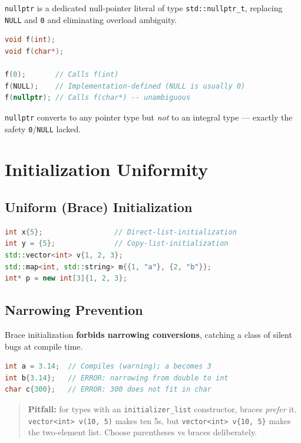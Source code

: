 \texttt{nullptr} is a dedicated null-pointer literal of type \texttt{std::nullptr\_t}, replacing \texttt{NULL} and \texttt{0} and eliminating overload ambiguity.

\begin{lstlisting}[language=C++, caption={nullptr resolves overload ambiguity}]
void f(int);
void f(char*);

f(0);       // Calls f(int)
f(NULL);    // Implementation-defined (NULL is usually 0)
f(nullptr); // Calls f(char*) -- unambiguous
\end{lstlisting}

\texttt{nullptr} converts to any pointer type but \emph{not} to an integral type --- exactly the safety \texttt{0}/\texttt{NULL} lacked.

\section{Initialization Uniformity}

\subsection{Uniform (Brace) Initialization}

\begin{lstlisting}[language=C++, caption={brace initialization everywhere}]
int x{5};                 // Direct-list-initialization
int y = {5};              // Copy-list-initialization
std::vector<int> v{1, 2, 3};
std::map<int, std::string> m{{1, "a"}, {2, "b"}};
int* p = new int[3]{1, 2, 3};
\end{lstlisting}

\subsection{Narrowing Prevention}

Brace initialization \textbf{forbids narrowing conversions}, catching a class of silent bugs at compile time.

\begin{lstlisting}[language=C++, caption={narrowing is a hard error inside braces}]
int a = 3.14;  // Compiles (warning); a becomes 3
int b{3.14};   // ERROR: narrowing from double to int
char c{300};   // ERROR: 300 does not fit in char
\end{lstlisting}

\begin{quote}
\textbf{Pitfall:} for types with an \texttt{initializer\_list} constructor, braces \emph{prefer} it. \texttt{vector<int> v(10, 5)} makes ten 5s, but \texttt{vector<int> v\{10, 5\}} makes the two-element list. Choose parentheses vs braces deliberately.
\end{quote}

